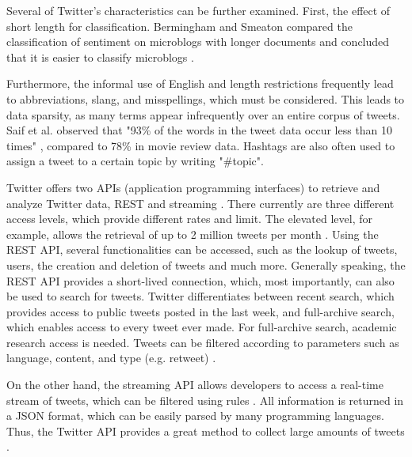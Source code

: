 Several of Twitter's characteristics can be further examined.
First, the effect of short length for classification. Bermingham and Smeaton compared the classification of sentiment on microblogs with longer documents and concluded that it is easier to classify microblogs \cite{microblogs}.

Furthermore, the informal use of English and length restrictions frequently lead to abbreviations, slang, and misspellings, which must be considered. This leads to data sparsity, as many terms appear infrequently over an entire corpus of tweets. Saif et al. observed that "93\% of the words in the tweet data occur less than 10 times" \cite[p.~3]{data_sparsity}, compared to 78\% in movie review data. Hashtags are also often used to assign a tweet to a certain topic by writing "\#topic". 

Twitter offers two APIs (application programming interfaces) to retrieve and analyze Twitter data, REST and streaming \cite{DBLP:journals/csur/GiachanouC16}. There currently are three different access levels, which provide different rates and limit. The elevated level, for example, allows the retrieval of up to 2 million tweets per month \cite{twitter:about}. Using the REST API, several functionalities can be accessed, such as the lookup of tweets, users, the creation and deletion of tweets and much more. Generally speaking, the REST API provides a short-lived connection, which, most importantly, can also be used to search for tweets. Twitter differentiates between recent search, which provides access to public tweets posted in the last week, and full-archive search, which enables access to every tweet ever made. For full-archive search, academic research access is needed. Tweets can be filtered according to parameters such as language, content, and type (e.g. retweet) \cite{twitter:search}. 

On the other hand, the streaming API allows developers to access a real-time stream of tweets, which can be filtered using rules \cite{twitter:stream}. All information is returned in a JSON format, which can be easily parsed by many programming languages. Thus, the Twitter API provides a great method to collect large amounts of tweets \cite{DBLP:journals/csur/GiachanouC16}.


